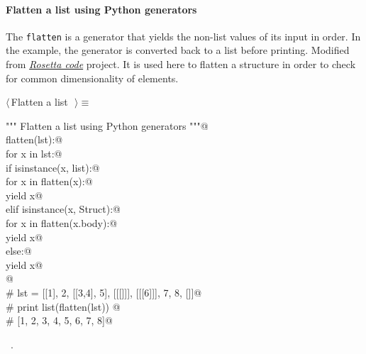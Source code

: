 \documentclass[11pt,oneside]{article}	%
\begin{document}
\paragraph{Flatten a list using Python generators}
The \texttt{flatten} is a generator that yields the non-list values of its input in order. In the example, the generator is converted back to a list before printing. Modified from \href{http://rosettacode.org/wiki/Flatten_a_list#Python}{\emph{Rosetta code}} project. It is used here to flatten a structure in order to check for common dimensionality of elements.

\begin{flushleft} \small \label{scrap35}
$\langle\,$Flatten a list\nobreak\ {\footnotesize {}}$\,\rangle\equiv$
\vspace{-1ex}
\begin{list}{}{} \item
\mbox{}\verb@""" Flatten a list using Python generators """@\\
\mbox{}\verb@def flatten(lst):@\\
\mbox{}\verb@   for x in lst:@\\
\mbox{}\verb@      if isinstance(x, list):@\\
\mbox{}\verb@         for x in flatten(x):@\\
\mbox{}\verb@            yield x@\\
\mbox{}\verb@      elif isinstance(x, Struct):@\\
\mbox{}\verb@         for x in flatten(x.body):@\\
\mbox{}\verb@            yield x@\\
\mbox{}\verb@      else:@\\
\mbox{}\verb@         yield x@\\
\mbox{}\verb@ @\\
\mbox{}\verb@# lst = [[1], 2, [[3,4], 5], [[[]]], [[[6]]], 7, 8, []]@\\
\mbox{}\verb@# print list(flatten(lst)) @\\
\mbox{}\verb@# [1, 2, 3, 4, 5, 6, 7, 8]@\\
\mbox{}\verb@@{\NWsep}
\end{list}
\vspace{-1ex}
\footnotesize\addtolength{\baselineskip}{-1ex}
\begin{list}{}{\setlength{\itemsep}{-\parsep}\setlength{\itemindent}{-\leftmargin}}
\item \NWtxtMacroRefIn\ .
\end{list}
\end{flushleft}
\end{document}
